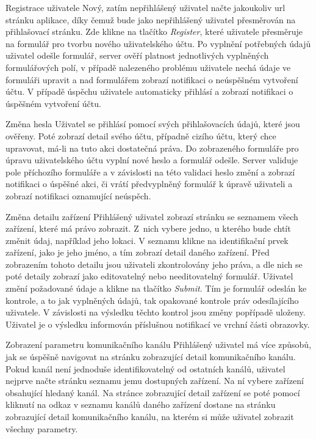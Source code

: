 \def\myprefix{UC}
\begin{enumfunctional}[style=nextline]
\item[Registrace uživatele] 
Nový, zatím nepřihlášený uživatel načte jakoukoliv \acrshort{url} stránku aplikace, díky čemuž bude jako nepřihlášený uživatel přesměrován na přihlašovací stránku. Zde klikne na tlačítko \emph{Register}, které uživatele přesměruje na formulář pro tvorbu nového uživatelského účtu. Po vyplnění potřebných údajů uživatel odešle formulář, server ověří platnost jednotlivých vyplněných formulářových polí, v případě nalezeného problému uživatele nechá údaje ve formuláři upravit a nad formulářem zobrazí notifikaci o neúspěšném vytvoření účtu. V případě úspěchu uživatele automaticky přihlásí a zobrazí notifikaci o úspěšném vytvoření účtu.
\item[Změna hesla]
Uživatel se přihlásí pomocí svých přihlašovacích údajů, které jsou ověřeny. Poté zobrazí detail svého účtu, případně cizího účtu, který chce upravovat, má-li na tuto akci dostatečná práva. Do zobrazeného formuláře pro úpravu uživatelského účtu vyplní nové heslo a formulář odešle. Server validuje pole příchozího formuláře a v závislosti na této validaci heslo změní a zobrazí notifikaci o úspěšné akci, či vrátí předvyplněný formulář k úpravě uživateli a zobrazí notifikaci oznamující neúspěch.
\item[Změna detailu zařízení]
Přihlášený uživatel zobrazí stránku se seznamem všech zařízení, které má právo zobrazit. Z~nich vybere jedno, u kterého bude chtít změnit údaj, například jeho lokaci. V seznamu klikne na identifikační prvek zařízení, jako je jeho jméno, a tím zobrazí detail daného zařízení. Před zobrazením tohoto detailu jsou uživateli zkontrolovány jeho práva, a dle nich se poté detaily zobrazí jako editovatelný nebo needitovatelný formulář. Uživatel změní požadované údaje a klikne na tlačítko \emph{Submit}. Tím je formulář odeslán ke kontrole, a to jak vyplněných údajů, tak opakované kontrole práv odesílajícího uživatele. V závislosti na výsledku těchto kontrol jsou změny popřípadě uloženy. Uživatel je o výsledku informován příslušnou notifikací ve vrchní části obrazovky.
\item[Zobrazení parametru komunikačního kanálu]
Přihlášený uživatel má více způsobů, jak se úspěšně navigovat na stránku zobrazující detail komunikačního kanálu. Pokud kanál není jednoduše identifikovatelný od ostatních kanálů, uživatel nejprve načte stránku seznamu jemu dostupných zařízení. Na ní vybere zařízení obsahující hledaný kanál. Na stránce zobrazující detail zařízení se poté pomocí kliknutí na odkaz v seznamu kanálů daného zařízení dostane na stránku zobrazující detail komunikačního kanálu, na kterém si může uživatel zobrazit všechny parametry.

\end{enumfunctional}
